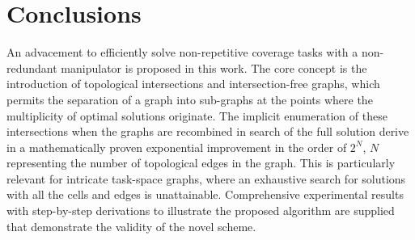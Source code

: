 \documentclass[conference]{IEEEtran}
\begin{document}
\section{Conclusions}
An advacement to efficiently solve non-repetitive coverage tasks with a non-redundant manipulator is proposed in this work. 
The core concept is the introduction of topological intersections and intersection-free graphs, which permits the separation of a graph 
into sub-graphs at the points where the multiplicity of optimal solutions originate. 
The implicit enumeration of these intersections when the graphs are recombined in search of the full solution derive in a mathematically proven exponential improvement in the order of $2^N$, $N$ representing the number of topological edges in the graph. This is particularly relevant for intricate task-space graphs,
where an exhaustive search for solutions with all the cells and edges is unattainable. 
Comprehensive experimental results with step-by-step derivations to illustrate the proposed algorithm are supplied that demonstrate the validity of the novel scheme. 
\label{section_conclusion}






\end{document}
